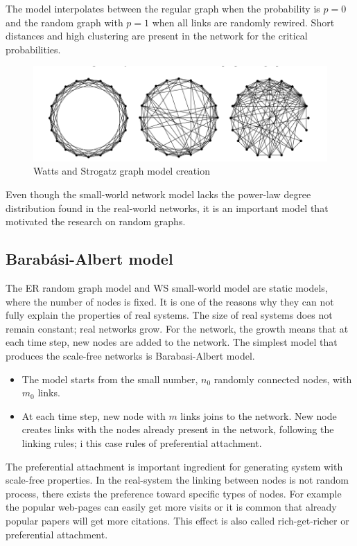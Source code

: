The model interpolates between the regular graph when the probability is $p=0$ and the random graph with $p=1$ when all links are randomly rewired. Short distances and high clustering are present in the network for the critical probabilities.

\begin{figure}[!ht]
	\centering
	\includegraphics[width=0.9\linewidth]{figures/methodology/ws_graph}
	\caption{Watts and Strogatz graph model creation}
	\label{fig:wsgraph}
\end{figure}

Even though the small-world network model lacks the power-law degree distribution found in the real-world networks, it is an important model that motivated the research on random graphs. 

\subsection{Barab\' {a}si-Albert model}

The ER random graph model and WS small-world model are static models, where the number of nodes is fixed. It is one of the reasons why they can not fully explain the properties of real systems. The size of real systems does not remain constant; real networks grow. For the network, the growth means that at each time step, new nodes are added to the network. The simplest model that produces the scale-free networks is Barabasi-Albert model.

\begin{itemize}
	\item The model starts from the small number, $n_0$ randomly connected nodes, with $m_0$ links.
	\item At each time step, new node with $m$ links joins to the network. New node creates links with the nodes already present in the network, following the linking rules; i this case rules of preferential attachment. 
\end{itemize}
 
The preferential attachment is important ingredient for generating system with scale-free properties. In the real-system the linking between nodes is not random process, there exists the preference toward specific types of nodes. For example the popular web-pages can easily get more visits or it is common that already popular papers will get more citations. This effect is also called rich-get-richer or preferential attachment.

